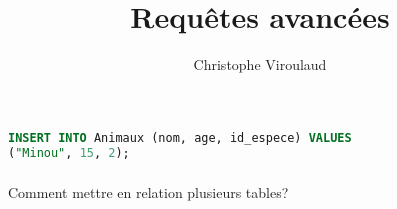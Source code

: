 \documentclass[svgnames,11pt]{beamer}
\author[]{Christophe Viroulaud}
\title{Requêtes avancées}
\date{\framebox{\textbf{BDD 06}}}
\institute{Terminale - NSI}
\begin{document}
\begin{frame}
\titlepage
\end{frame}
\begin{frame}[fragile]
    \frametitle{}

\begin{center}
\begin{lstlisting}[language=SQL , basicstyle=\ttfamily\small, xleftmargin=1em, xrightmargin=0em]
INSERT INTO Animaux (nom, age, id_espece) VALUES 
("Minou", 15, 2);
\end{lstlisting}
\label{CODE}
\end{center}

\end{frame}
\begin{frame}
    \frametitle{}

    \begin{framed}
        \centering Comment mettre en relation plusieurs tables?
    \end{framed}

\end{frame}
\end{document}
